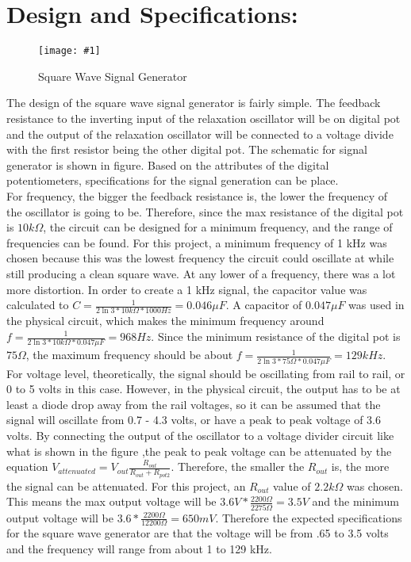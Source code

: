 \documentclass[12pt]{article}
\newcommand{\myfig}[2] {
    \label{page:#1}
    \begin{figure}[ht]
        \begin{framed}
        \centering
          \texttt{[image: \#1]}\\
          \caption{#2}\label{fig:#1}
        \end{framed}
    \end{figure}
}
\begin{document}
\section{Design and Specifications:} \myfig{part3}{Square Wave Signal Generator}
\indent The design of the square wave signal generator is fairly simple. The feedback resistance to the inverting input of the relaxation oscillator will be on digital pot and the output of the relaxation oscillator will be connected to a voltage divide with the first resistor being the other digital pot. The schematic for signal generator is shown in figure. Based on the attributes of the digital potentiometers, specifications for the signal generation can be place.\\ 
 For frequency, the bigger the feedback resistance is, the lower the frequency of the oscillator is going to be. Therefore, since the max resistance of the digital pot is $10k\Omega$, the circuit can be designed for a minimum frequency, and the range of frequencies can be found. For this project, a minimum frequency of 1 kHz was chosen because this was the lowest frequency the circuit could oscillate at while still producing a clean square wave. At any lower of a frequency, there was a lot more distortion. In order to create a 1 kHz signal, the capacitor value was calculated to $C = \frac{1}{2\ln 3*10k\Omega*1000Hz} = 0.046\mu F$. A capacitor of $0.047 \mu F$ was used in the physical circuit, which makes the minimum frequency around $f = \frac{1}{2\ln 3*10k\Omega*0.047 \mu F} = 968 Hz$. Since the minimum resistance of the digital pot is $75\Omega$, the maximum frequency should be about $f = \frac{1}{2\ln 3*75\Omega*0.047 \mu F} = 129 kHz$.\\
 \indent For voltage level, theoretically, the signal should be oscillating from rail to rail, or 0 to 5 volts in this case. However, in the physical circuit, the output has to be at least a diode drop away from the rail voltages, so it can be assumed that the signal will oscillate from 0.7 - 4.3 volts, or have a peak to peak voltage of 3.6 volts. By connecting the output of the oscillator to a voltage divider circuit like what is shown in the figure ,the peak to peak voltage can be attenuated by the equation  $V_{attenuated} = V_{out}\frac{R_{out}}{R_{out}+R_{pot2}}$. Therefore, the smaller the $R_{out}$ is, the more the signal can be attenuated. For this project, an $R_{out}$ value of $2.2k\Omega$ was chosen. This means the max output voltage will be $3.6V * \frac{2200\Omega}{2275\Omega} = 3.5 V$ and the minimum output voltage will be $3.6*\frac{2200\Omega}{12200\Omega}= 650 mV$. Therefore the expected specifications for the square wave generator are that the voltage will be from .65 to 3.5 volts and the frequency will range from about 1 to 129 kHz. 
\end{document}

